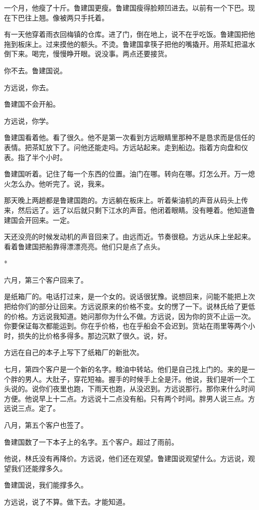 \documentclass[UTF8,a5paper,11pt,openany]{ctexbook}
\newcommand{\scene}{\vspace{1em}\begin{center}*\quad*\quad*\end{center}\vspace{0.5em}}
\begin{document}
一个月，他瘦了十斤。鲁建国更瘦。鲁建国瘦得脸颊凹进去。以前有一个下巴。现在下巴往上翘。像被两只手托着。

有一天他穿着雨衣回梅镇的仓库。进了门，倒在地上，说不在乎吃饭。鲁建国把他拖到板床上。过来摸他的额头。不烫。鲁建国拿筷子把他的嘴撬开。用茶缸把温水倒下来。喝完，慢慢睁开眼。说没事。两点还要接货。

你不去。鲁建国说。

方远说，你去。

鲁建国不会开船。

方远说，你学。

鲁建国看着他。看了很久。他不是第一次看到方远眼睛里那种不是恳求而是信任的表情。把茶缸放下了。问他还能走吗。方远站起来。走到船边。指着方向盘和仪表。指了半个小时。

鲁建国听着。记住了每一个东西的位置。油门在哪。转向在哪。灯怎么开。万一熄火怎么办。他听完了。说，我来。

那天晚上两趟都是鲁建国跑的。方远躺在板床上。听着柴油机的声音从码头上传来，然后远了。远了以后就只剩下江水的声音。他闭着眼睛。没有睡着。他知道鲁建国会开回来。一定。

天还没亮的时候发动机的声音回来了。由远而近。节奏很稳。方远从床上坐起来。看着鲁建国把船靠得漂漂亮亮。他们只是点了点头。


\scene

六月，第三个客户回来了。

是纸箱厂的。电话打过来，是一个女的。说话很犹豫。说想回来，问能不能把上次把给你们的部分让回来。方远说原来的价格不变。女的愣了一下。说林氏给了更低的价格。方远说我知道。她问那你为什么不做。方远说，因为你的货不止运一次。你要保证每次都能运到。你在乎价格，也在乎船会不会迟到。货站在雨里等两个小时，损失的比价格多得多。那边沉默了很久。说，好。

方远在自己的本子上写下了纸箱厂的新批次。

七月，第四个客户是一个新的名字。粮油中转站。他们是自己找上门的。来的是一个胖的男人。大肚子，穿花短袖。握手的时候手上全是汗。他说，我们是听一个工头说的。说你们夜里也跑，下雨天也跑，从没迟到。方远说那行。那你来什么时间方便。他说早上十二点。方远说十二点没有船。只有两个时间。胖男人说三点。方远说三点。定了。

八月，第五个客户也签了。

鲁建国数了一下本子上的名字。五个客户。超过了雨前。

他说，林氏没有再降价。方远说，他们还在观望。鲁建国说观望什么。方远说，观望我们还能撑多久。

鲁建国说，我们能撑多久。

方远说，说了不算。做下去。才能知道。
\end{document}
